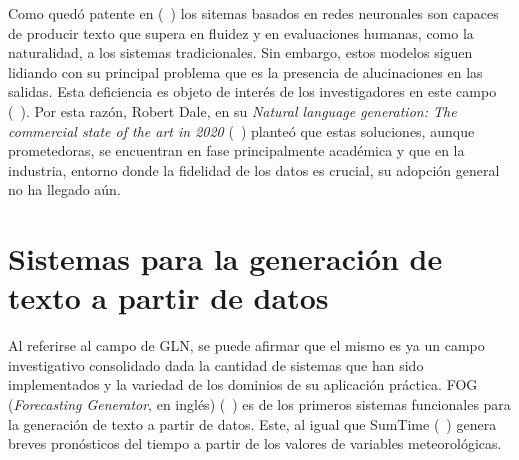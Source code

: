     Como quedó patente en (~\cite{wiseman-etal-2017-challenges,ferreira2019neural,duvsek2020evaluating,sharma2022innovations}) los sitemas basados en redes neuronales
son capaces de producir texto que supera en fluidez y en evaluaciones humanas, como la naturalidad, a los sistemas tradicionales. Sin embargo, estos modelos siguen lidiando con su principal
problema que es la presencia de alucinaciones en las salidas. Esta deficiencia es objeto de interés de los investigadores en este campo (~\cite{ji2022survey}). Por esta razón, Robert Dale, 
en su \textit{Natural language generation: The commercial state of the art in 2020} (~\cite{dale2020natural}) planteó que estas soluciones, aunque prometedoras, se 
encuentran en fase principalmente académica y que en la industria, entorno donde la fidelidad de los datos es crucial, su adopción general no ha llegado aún.   


\section{Sistemas para la generación de texto a partir de datos}

    Al referirse al campo de GLN, se puede afirmar que el mismo es ya un campo investigativo consolidado dada la cantidad 
de sistemas que han sido implementados y la variedad de los dominios de su aplicación práctica. FOG (\emph{Forecasting Generator}, en inglés) (~\cite{goldberg1994using}) es 
de los primeros sistemas funcionales para la generación de texto a partir de datos. Este, al igual que SumTime (~\cite{reiter2005choosing}) genera breves pronósticos del tiempo
a partir de los valores de variables meteorológicas. 

